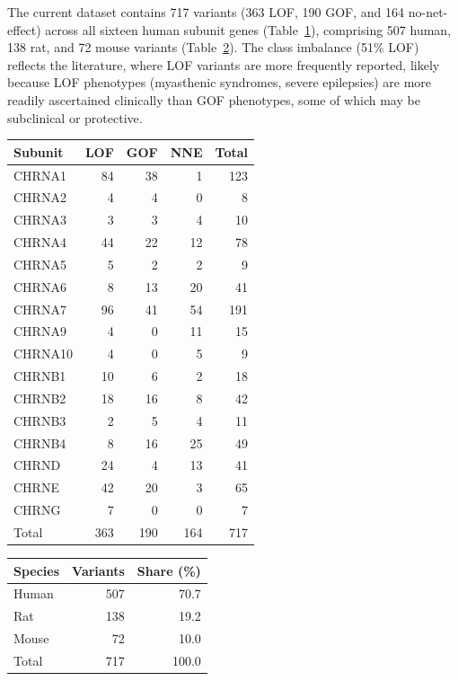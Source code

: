 \documentclass{ws-procs11x85}
\begin{document}
The current dataset contains 717 variants (363 LOF, 190 GOF, and
164 no-net-effect) across all sixteen human subunit genes
(Table~\ref{tab:subunit_counts}), comprising 507 human, 138 rat, and
72 mouse variants (Table~\ref{tab:species}). The class imbalance (51\% LOF) reflects the
literature, where LOF variants are more frequently reported, likely
because LOF phenotypes (myasthenic syndromes, severe epilepsies) are
more readily ascertained clinically than GOF phenotypes, some of which
may be subclinical or protective.

\begin{table}[ht]
{\begin{tabular}{@{}lrrrr@{}}
\toprule
Subunit & LOF & GOF & NNE & Total \\
\midrule
CHRNA1  &  84 & 38 &  1 & 123 \\
CHRNA2  &   4 &  4 &  0 &   8 \\
CHRNA3  &   3 &  3 &  4 &  10 \\
CHRNA4  &  44 & 22 & 12 &  78 \\
CHRNA5  &   5 &  2 &  2 &   9 \\
CHRNA6  &   8 & 13 & 20 &  41 \\
CHRNA7  &  96 & 41 & 54 & 191 \\
CHRNA9  &   4 &  0 & 11 &  15 \\
CHRNA10 &   4 &  0 &  5 &   9 \\
CHRNB1  &  10 &  6 &  2 &  18 \\
CHRNB2  &  18 & 16 &  8 &  42 \\
CHRNB3  &   2 &  5 &  4 &  11 \\
CHRNB4  &   8 & 16 & 25 &  49 \\
CHRND   &  24 &  4 & 13 &  41 \\
CHRNE   &  42 & 20 &  3 &  65 \\
CHRNG   &   7 &  0 &  0 &   7 \\
\midrule
Total   & 363 & 190 & 164 & 717 \\
\bottomrule
\end{tabular}}
\label{tab:subunit_counts}
\end{table}

\begin{table}[ht]
{\begin{tabular}{@{}lrr@{}}
\toprule
Species & Variants & Share (\%) \\
\midrule
Human & 507 & 70.7 \\
Rat   & 138 & 19.2 \\
Mouse &  72 & 10.0 \\
\midrule
Total & 717 & 100.0 \\
\bottomrule
\end{tabular}}
\label{tab:species}
\end{table}
\end{document}
